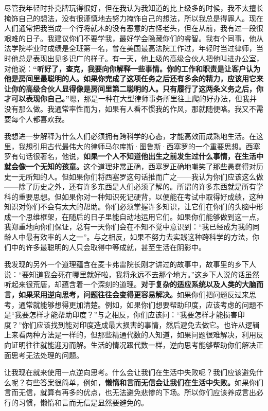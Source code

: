 尽管我年轻时扑克牌玩得很好，但在我认为我知道的比上级多的时候，我不太擅长掩饰自己的想法，没有很谨慎地去努力掩饰自己的想法，所以我总是得罪人。现在人们通常把我当成一个行将就木的没有恶意的古怪老头，但在从前，我有过一段很艰难的日子。我建议你们不要学我，最好学会隐藏你们的睿智。我有个同事，他从法学院毕业时成绩是全班第一名，曾在美国最高法院工作过，年轻时当过律师，当时他总是表现出见多识广的样子。有一天，他上级的高级合伙人把他叫进办公室，对他说：\textbf{“听好了，查克，我要向你解释一些事情。你的工作和职责是让客户认为他是房间里最聪明的人。如果你完成了这项任务之后还有多余的精力，应该用它来让你的高级合伙人显得像是房间里第二聪明的人。只有履行了这两条义务之后，你才可以表现你自己。”}嗯，那是一种在大型律师事务所里往上爬的好办法，但我并没有那么做。我通常率性而为，如果有人看不惯我的作风，那就随便咯。我又不需要每个人都喜欢我。
\par

我想进一步解释为什么人们必须拥有跨科学的心态，才能高效而成熟地生活。在这里，我想引用古代最伟大的律师马尔库斯·图鲁斯·西塞罗的一个重要思想。西塞罗有句话很著名，他说，\textbf{如果一个人不知道他出生之前发生过什么事情，在生活中就会像一个无知的孩童。}这个道理非常正确，西塞罗正确地嘲笑了那些愚蠢得对历史一无所知的人。但如果你们将西塞罗这句话推而广之——我认为你们应该这么做——除了历史之外，还有许多东西是人们必须了解的。所谓的许多东西就是所有学科的重要思想。但如果你对一种知识死记硬背，以便能在考试中取得好成绩，这种知识对你们不会有太大的帮助。你们必须掌握许多知识，让它们在你们的头脑中形成一个思维框架，在随后的日子里能自动地运用它们。如果你们能够做到这一点，我郑重地向你们保证，总有一天你们会在不知不觉中意识到：“我已经成为我的同龄人中最有效率的人之一”。与之相反，如果不努力去实践这种跨科学的方法，你们中的许多最聪明的人只会取得中等成就，甚至生活在阴影中。
\par

我发现的另外一个道理蕴含在麦卡弗雷院长刚才讲过的故事中，故事里的乡下人说：“要知道我会死在哪里就好啦，我将永远不去那个地方。”这乡下人说的话虽然听起来很荒唐，却蕴含着一个深刻的道理。\textbf{对于复杂的适应系统以及人类的大脑而言，如果采用逆向思考，问题往往会变得更容易解决。}如果你们把问题反过来思考，通常就能够想得更加清楚。例如，如果你们想要帮助印度，应该考虑的问题不是“我要怎样才能帮助印度？”与之相反，你们应该问：“我要怎样才能损害印度？”你们应该找到能对印度造成最大损害的事情，然后避免去做它。也许从逻辑上来看两种方法是一样的，但那些精通代数的人知道，如果问题很难解决，利用反向证明往往就能迎刃而解。生活的情况跟代数一样，逆向思考能够帮助你们解决正面思考无法处理的问题。
\par

让我现在就来使用一点逆向思考。什么会让我们在生活中失败呢？我们应该避免什么呢？有些答案很简单，例如，\textbf{懒惰和言而无信会让我们在生活中失败。}如果你们言而无信，就算有再多的优点，也无法避免悲惨的下场。所以你们应该养成言出必行的习惯，懒惰和言而无信是显然要避免的。
\par

